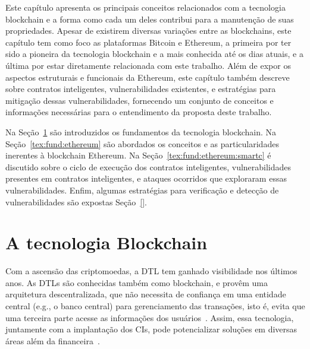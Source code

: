 Este capítulo apresenta os principais conceitos relacionados com a tecnologia blockchain e a forma como cada um deles contribui para a manutenção de suas propriedades. Apesar de existirem diversas variações entre as blockchains, este capítulo tem como foco as plataformas Bitcoin e Ethereum, a primeira por ter sido a pioneira da tecnologia blockchain e a mais conhecida até os dias atuais, e a última por estar diretamente relacionada com este trabalho. Além de expor os aspectos estruturais e funcionais da Ethereum, este capítulo também descreve sobre contratos inteligentes, vulnerabilidades existentes, e estratégias para mitigação dessas vulnerabilidades, fornecendo um conjunto de conceitos e informações necessárias para o entendimento da proposta deste trabalho.

Na Seção~\ref{tex:fund:blockchain} são introduzidos os fundamentos da tecnologia blockchain. Na Seção~\ref{tex:fund:ethereum} são abordados os conceitos e as particularidades inerentes à blockchain Ethereum. Na Seção~\ref{tex:fund:ethereum:smartc} é discutido sobre o ciclo de execução dos contratos inteligentes, vulnerabilidades presentes em contratos inteligentes, e ataques ocorridos que exploraram essas vulnerabilidades. Enfim, algumas estratégias para verificação e detecção de vulnerabilidades são expostas Seção~\ref{}. 

\section{A tecnologia Blockchain} \label{tex:fund:blockchain}

Com a ascensão das criptomoedas, a DTL tem ganhado visibilidade nos últimos anos. As DTLs são conhecidas também como blockchain, e provêm uma arquitetura descentralizada, que não necessita de confiança em uma entidade central (e.g., o banco central) para gerenciamento das transações, isto é, evita que uma terceira parte acesse as informações dos usuários~\cite{monrat2019survey-blockchain-ieee}. Assim, essa tecnologia, juntamente com a implantação dos CIs, pode potencializar soluções em diversas áreas além da financeira~\cite{swan2015blockchain-book}.

